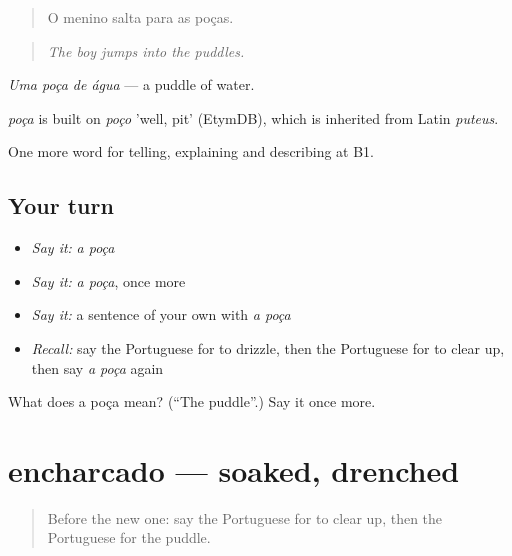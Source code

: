 \begin{quote}
O menino salta para as poças.
\end{quote}

\begin{quote}
\emph{The boy jumps into the puddles.}
\end{quote}

\emph{Uma poça de água} — a puddle of water.

\begin{cousinweb}
\emph{poça} is built on \emph{poço} 'well, pit' (EtymDB), which is inherited from Latin \emph{puteus}.
\end{cousinweb}

\begin{grammarlens}[title={What you've built}]
One more word for telling, explaining and describing at B1.
\end{grammarlens}

\subsection*{Your turn}
\begin{itemize}
\raggedright
  \item \emph{Say it:} \emph{a poça}
  \item \emph{Say it:} \emph{a poça}, once more
  \item \emph{Say it:} a sentence of your own with \emph{a poça}
  \item \emph{Recall:} say the Portuguese for to drizzle, then the Portuguese for to clear up, then say \emph{a poça} again
\end{itemize}

\begin{tcolorbox}[breakable,colback=teal!4,colframe=teal!35!black,title={Before you move on}]
What does a poça mean? (\textquotedblleft{}The puddle\textquotedblright{}.) Say it once more.
\end{tcolorbox}
\section[encharcado]{encharcado — soaked, drenched}

\label{lesson:PT-C466-encharcado}



\begin{quote}
Before the new one: say the Portuguese for to clear up, then the Portuguese for the puddle.
\end{quote}

